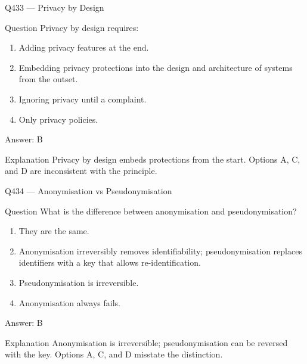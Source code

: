 \documentclass[aspectratio=169,8pt]{beamer}
\begin{document}
	\begin{frame}{Q433 --- Privacy by Design}
		\begin{block}{Question}
			Privacy by design requires:
			\begin{enumerate}
				\item Adding privacy features at the end.
				\item Embedding privacy protections into the design and architecture of systems from the outset.
				\item Ignoring privacy until a complaint.
				\item Only privacy policies.
			\end{enumerate}
		\end{block}
		\begin{exampleblock}{Answer: B}\end{exampleblock}
		\begin{block}{Explanation}
			Privacy by design embeds protections from the start. Options A, C, and D are inconsistent with the principle.
		\end{block}
	\end{frame}
	
	\begin{frame}{Q434 --- Anonymisation vs Pseudonymisation}
		\begin{block}{Question}
			What is the difference between anonymisation and pseudonymisation?
			\begin{enumerate}
				\item They are the same.
				\item Anonymisation irreversibly removes identifiability; pseudonymisation replaces identifiers with a key that allows re-identification.
				\item Pseudonymisation is irreversible.
				\item Anonymisation always fails.
			\end{enumerate}
		\end{block}
		\begin{exampleblock}{Answer: B}\end{exampleblock}
		\begin{block}{Explanation}
			Anonymisation is irreversible; pseudonymisation can be reversed with the key. Options A, C, and D misstate the distinction.
		\end{block}
	\end{frame}
	
\end{document}
